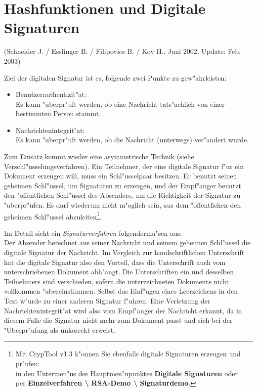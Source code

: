 
\newpage
\section{Hashfunktionen und Digitale Signaturen}
(Schneider J. / Esslinger B. / Filipovics B. / Koy H., Juni 2002, 
Update: Feb. 2003)

\vspace{12pt}
Ziel der digitalen Signatur ist es, folgende zwei Punkte zu gew"ahrleisten:
\begin{itemize}
 \item Benutzerauthentizit"at:  \\
      Es kann "uberpr"uft werden, ob eine Nachricht tats"achlich von einer bestimmten Person stammt.
 \item Nachrichtenintegrit"at:  \\
      Es kann "uberpr"uft werden, ob die Nachricht (unterwegs) ver"andert wurde.
\end{itemize}


Zum Einsatz kommt wieder eine asymmetrische Technik (siehe 
Verschl"usselungsverfahren).
Ein Teilnehmer, der eine digitale Signatur f"ur ein Dokument erzeugen will,
muss ein Schl"usselpaar besitzen. Er benutzt seinen geheimen Schl"ussel,
um Signaturen zu erzeugen, und der Empf"anger benutzt den "offentlichen
Schl"ussel des Absenders, um die Richtigkeit der Signatur zu "uberpr"ufen.
Es darf wiederum nicht m"oglich sein, aus dem "offentlichen den geheimen
Schl"ussel abzuleiten\footnote{%
Mit CrypTool v1.3 k"onnen Sie ebenfalls digitale Signaturen
erzeugen und pr"ufen: \\
in den Untermen"us des Hauptmen"upunktes {\bf Digitale Signaturen} oder \\
per 
{\bf Einzelverfahren \textbackslash{} RSA-Demo \textbackslash{} Signaturdemo}.
}.


Im Detail sieht ein  {\em Signaturverfahren} 
folgenderma"sen aus: \\
Der Absender berechnet aus seiner Nachricht und seinem geheimen Schl"ussel
die digitale Signatur der Nachricht. Im Vergleich zur handschriftlichen
Unterschrift hat die digitale Signatur also den Vorteil, dass die 
Unterschrift auch vom unterschriebenen Dokument abh"angt. Die Unterschriften
ein und desselben Teilnehmers sind verschieden, sofern die unterzeichneten
Dokumente nicht vollkommen "ubereinstimmen. Selbst das Einf"ugen eines
Leerzeichens in den Text w"urde zu einer anderen Signatur f"uhren. Eine
Verletzung der Nachrichtenintegrit"at wird also vom Empf"anger der 
Nachricht erkannt, da in diesem Falle die Signatur nicht mehr zum Dokument
passt und sich bei der "Uberpr"ufung als unkorrekt erweist.

